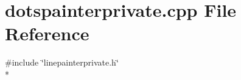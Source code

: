 \section{dotspainterprivate.\+cpp File Reference}
\label{curve_2painters_2dotspainterprivate_8cpp}
{\ttfamily \#include \char`\"{}linepainterprivate.\+h\char`\"{}}\\*
